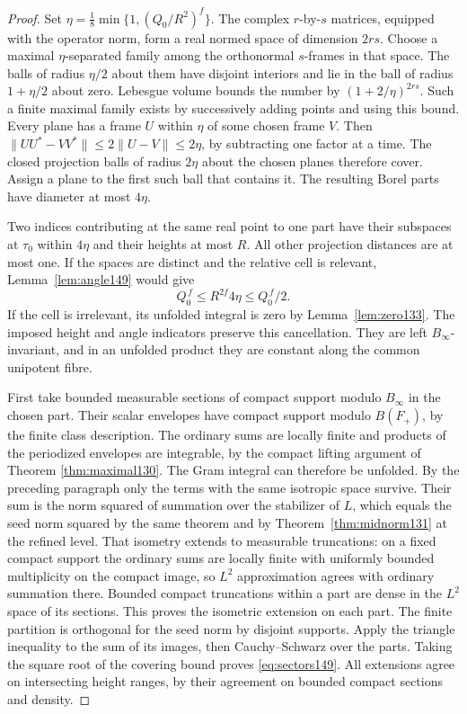 \documentclass[a4paper,11pt]{article}
\theoremstyle{definition}
\theoremstyle{remark}
\numberwithin{equation}{section}
\begin{document}
\begin{proof}
Set \(\eta=\tfrac18\min\{1,(Q_0/R^2)^f\}\). The complex
\(r\)-by-\(s\) matrices, equipped with the operator norm,
form a real normed space of dimension \(2rs\). Choose a
maximal \(\eta\)-separated family among the orthonormal
\(s\)-frames in that space. The balls of radius \(\eta/2\)
about them have disjoint interiors and lie in the ball of
radius \(1+\eta/2\) about zero. Lebesgue volume bounds the
number by \((1+2/\eta)^{2rs}\). Such a finite maximal family
exists by successively adding points and using this bound.
Every plane has a frame \(U\) within \(\eta\) of some chosen
frame \(V\). Then
\(\|UU^*-VV^*\|\le2\|U-V\|\le2\eta\), by subtracting one
factor at a time. The closed projection balls of radius
\(2\eta\) about the chosen planes therefore cover. Assign a
plane to the first such ball that contains it. The resulting
Borel parts have diameter at most \(4\eta\).

Two indices contributing at the same real point to one part
have their subspaces at \(\tau_0\) within \(4\eta\) and their
heights at most \(R\). All other projection distances are
at most one. If the spaces are distinct and the relative
cell is relevant, Lemma~\ref{lem:angle149} would give
\[
        Q_0^{\,f}\le R^{2f}4\eta\le Q_0^{\,f}/2 .
\]
If the cell is irrelevant, its unfolded integral is zero by
Lemma~\ref{lem:zero133}. The imposed height and angle
indicators preserve this cancellation. They are left
\(B_\infty\)-invariant, and in an unfolded product they are
constant along the common unipotent fibre.

First take bounded measurable sections of compact support
modulo \(B_\infty\) in the chosen part. Their scalar envelopes
have compact support modulo \(B(F_+)\), by the finite class
description. The ordinary sums are locally finite and products
of the periodized envelopes are integrable, by the compact
lifting argument of
Theorem \ref{thm:maximal130}.
The Gram integral can therefore be unfolded. By the preceding
paragraph only the terms with the same isotropic space
survive. Their sum is the norm squared of summation over
the stabilizer of \(L\), which equals the seed norm squared
by the same theorem and by Theorem~\ref{thm:midnorm131} at
the refined level. That isometry extends to measurable
truncations: on a fixed compact support the ordinary sums are
locally finite with uniformly bounded multiplicity on the
compact image, so \(L^2\) approximation agrees with ordinary
summation there. Bounded compact truncations within a part
are dense in the \(L^2\) space of its sections. This proves
the isometric extension on each part. The finite partition is
orthogonal for the seed norm by disjoint supports. Apply the
triangle inequality to the sum of its images, then
Cauchy--Schwarz over the parts. Taking the square root of the
covering bound proves \eqref{eq:sectors149}. All extensions
agree on intersecting height ranges, by their agreement on
bounded compact sections and density.
\end{proof}
\end{document}
